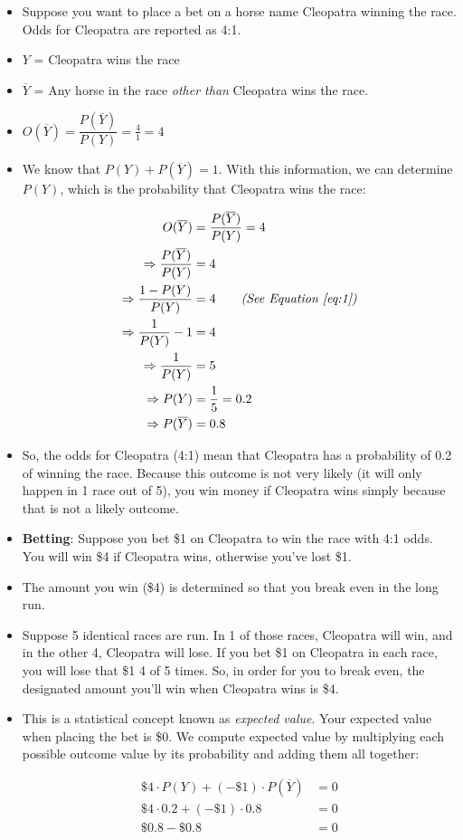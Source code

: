 \documentclass[]{book}
\providecommand{\tightlist}{%
  \setlength{\itemsep}{0pt}\setlength{\parskip}{0pt}}
\theoremstyle{definition}
\theoremstyle{definition}
\theoremstyle{remark}
\begin{document}
\begin{itemize}
\tightlist
\item
  Suppose you want to place a bet on a horse name Cleopatra winning the
  race. Odds for Cleopatra are reported as 4:1.
\item
  \(Y\) = Cleopatra wins the race
\item
  \(\overline{Y}\) = Any horse in the race \emph{other than} Cleopatra
  wins the race.
\item
  \(O(\overline{Y}) = \dfrac{P(\overline{Y})}{P(Y)} = \frac{4}{1} = 4\)
\item
  We know that \(P(Y) + P(\overline{Y})=1\). With this information, we
  can determine \(P(Y)\), which is the probability that Cleopatra wins
  the race:

  \begin{align*}
  O(\overline{Y}) & = \dfrac{P(\overline{Y})}{P(Y)} = 4 \\
  \Rightarrow  \dfrac{P(\overline{Y})}{P(Y)} & = 4 \\ \Rightarrow  \dfrac{1 - P(Y)}{P(Y)} & = 4 \quad \quad \textit{(See Equation \ref{eq:1})} \\ 
  \Rightarrow \dfrac{1}{P(Y)} - 1 & = 4 \\
  \Rightarrow \dfrac{1}{P(Y)} & = 5 \\
  \Rightarrow P(Y) & = \frac{1}{5} = 0.2 \\
  \Rightarrow P(\overline{Y}) & = 0.8
  \end{align*}
\item
  So, the odds for Cleopatra (4:1) mean that Cleopatra has a probability
  of 0.2 of winning the race. Because this outcome is not very likely
  (it will only happen in 1 race out of 5), you win money if Cleopatra
  wins simply because that is not a likely outcome.
\item
  \textbf{Betting}: Suppose you bet \$1 on Cleopatra to win the race
  with 4:1 odds. You will win \$4 if Cleopatra wins, otherwise you've
  lost \$1.
\item
  The amount you win (\$4) is determined so that you break even in the
  long run.
\item
  Suppose 5 identical races are run. In 1 of those races, Cleopatra will
  win, and in the other 4, Cleopatra will lose. If you bet \$1 on
  Cleopatra in each race, you will lose that \$1 4 of 5 times. So, in
  order for you to break even, the designated amount you'll win when
  Cleopatra wins is \$4.
\item
  This is a statistical concept known as \emph{expected value}. Your
  expected value when placing the bet is \$0. We compute expected value
  by multiplying each possible outcome value by its probability and
  adding them all together:

  \begin{align*}
  \$4\cdot P(Y) + (-\$1) \cdot P(\overline{Y}) & = 0 \\
  \$4\cdot 0.2 + (-\$1) \cdot 0.8 & = 0 \\
  \$0.8 - \$0.8 & = 0
  \end{align*}
\end{itemize}
\end{document}
